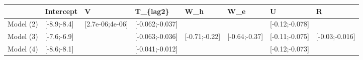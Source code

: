 \begin{table}[ht]
\centering
\begin{tabular}{rlllllll}
  \hline
 & Intercept & V & T\_\{lag2\} & W\_h & W\_e & U & R \\ 
  \hline
Model (2) & [-8.9;-8.4] & [2.7e-06;4e-06] & [-0.062;-0.037] &  &  & [-0.12;-0.078] &  \\ 
  Model (3) & [-7.6;-6.9] &  & [-0.063;-0.036] & [-0.71;-0.22] & [-0.64;-0.37] & [-0.11;-0.075] & [-0.03;-0.016] \\ 
  Model (4) & [-8.6;-8.1] &  & [-0.041;-0.012] &  &  & [-0.12;-0.073] &  \\ 
   \hline
\end{tabular}
\end{table}
